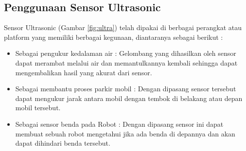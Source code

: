 \subsection{Penggunaan Sensor Ultrasonic}
Sensor Ultrasonic (Gambar \ref{fig:ultra}) telah dipakai di berbagai perangkat atau platform yang memiliki berbagai kegunaan, diantaranya sebagai berikut : 
\begin{itemize}
	\item Sebagai pengukur kedalaman air : Gelombang yang dihasilkan oleh sensor dapat merambat melalui air dan memantulkannya kembali sehingga dapat mengembalikan hasil yang akurat dari sensor.
	\item Sebagai membantu proses parkir mobil :  Dengan dipasang sensor tersebut dapat mengukur jarak antara mobil dengan tembok di belakang atau depan mobil tersebut.
	\item Sebagai sensor benda pada Robot : Dengan dipasang sensor ini dapat membuat sebuah robot mengetahui jika ada benda di depannya dan akan dapat dihindari benda tersebut.
\end{itemize}